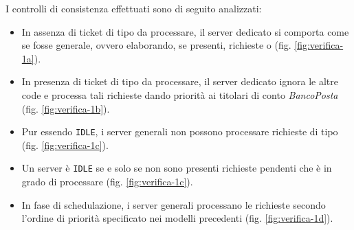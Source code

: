 I controlli di consistenza effettuati sono di seguito analizzati:
\begin{itemize}
\item In assenza di ticket di tipo \sr{} da processare, il server dedicato si comporta come se fosse generale, ovvero elaborando, se presenti, richieste \uo{} o \pp{} (fig. \ref{fig:verifica-1a}).
\item In presenza di ticket di tipo \sr{} da processare, il server dedicato ignora le altre code e processa tali richieste dando priorità ai titolari di conto \textsl{BancoPosta} (fig. \ref{fig:verifica-1b}).
\item Pur essendo \texttt{IDLE}, i server generali non possono processare richieste di tipo \sr{} (fig. \ref{fig:verifica-1c}).
\item Un server è \texttt{IDLE} se e solo se non sono presenti richieste pendenti che è in grado di processare (fig. \ref{fig:verifica-1c}).
\item In fase di schedulazione, i server generali processano le richieste secondo l'ordine di priorità specificato nei modelli precedenti (fig. \ref{fig:verifica-1d}).
\end{itemize}